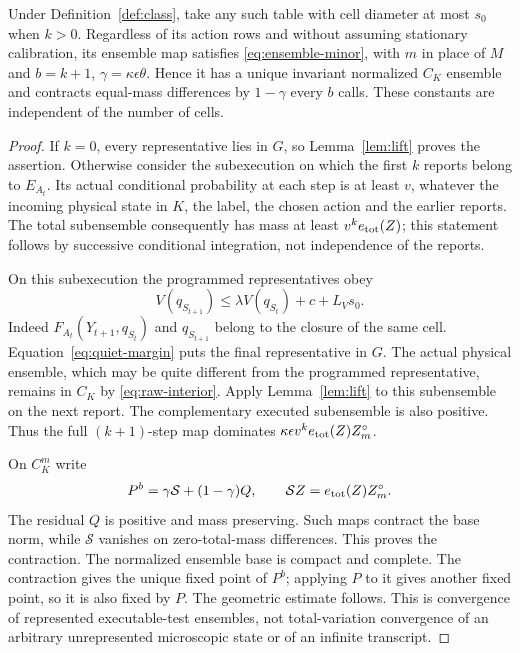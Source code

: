 \begin{lemma}\label{lem:uniform-mixing}
Under Definition~\ref{def:class}, take any such table with cell diameter at most $s_0$ when $k>0$. Regardless of its action rows and without assuming stationary calibration, its ensemble map satisfies \eqref{eq:ensemble-minor}, with $m$ in place of $M$ and $b=k+1$, $\gamma=\kappa\epsilon\theta$. Hence it has a unique invariant normalized $C_K$ ensemble and contracts equal-mass differences by $1-\gamma$ every $b$ calls. These constants are independent of the number of cells.
\end{lemma}
\begin{proof}
If $k=0$, every representative lies in $G$, so Lemma~\ref{lem:lift} proves the assertion. Otherwise consider the subexecution on which the first $k$ reports belong to $E_{A_t}$. Its actual conditional probability at each step is at least $v$, whatever the incoming physical state in $K$, the label, the chosen action and the earlier reports. The total subensemble consequently has mass at least $v^k e_{\rm tot}(Z)$; this statement follows by successive conditional integration, not independence of the reports.

On this subexecution the programmed representatives obey
\[
 V(q_{S_{t+1}})\le\lambda V(q_{S_t})+c+L_Vs_0.
\]
Indeed $F_{A_t}(Y_{t+1},q_{S_t})$ and $q_{S_{t+1}}$ belong to the closure of the same cell. Equation~\eqref{eq:quiet-margin} puts the final representative in $G$. The actual physical ensemble, which may be quite different from the programmed representative, remains in $C_K$ by \eqref{eq:raw-interior}. Apply Lemma~\ref{lem:lift} to this subensemble on the next report. The complementary executed subensemble is also positive. Thus the full $(k+1)$-step map dominates
$\kappa\epsilon v^k e_{\rm tot}(Z)Z_m^\circ$.

On $C_K^m$ write
\[
 P^b=\gamma\mathcal S+(1-\gamma)Q,
 \qquad \mathcal S Z=e_{\rm tot}(Z)Z_m^\circ.
\]
The residual $Q$ is positive and mass preserving. Such maps contract the base norm, while $\mathcal S$ vanishes on zero-total-mass differences. This proves the contraction. The normalized ensemble base is compact and complete. The contraction gives the unique fixed point of $P^b$; applying $P$ to it gives another fixed point, so it is also fixed by $P$. The geometric estimate follows. This is convergence of represented executable-test ensembles, not total-variation convergence of an arbitrary unrepresented microscopic state or of an infinite transcript.
\end{proof}

